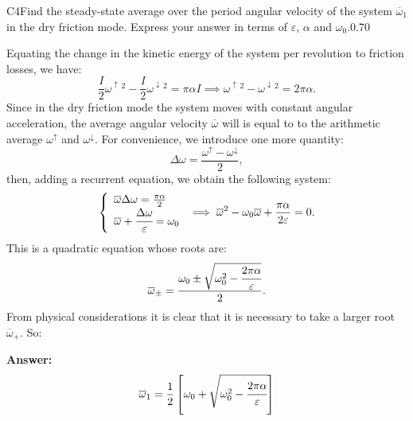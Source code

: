 \documentclass[11pt,a4paper]{article}
\begin{document}
\begin{solcard}{C4}{Find the steady-state average over the period angular velocity of the system $\overline\omega_1$ in the dry friction mode. Express your answer in terms of $\varepsilon$, $\alpha$ and $\omega_0$.}{0.70}

Equating the change in the kinetic energy of the system per revolution to friction losses, we have: \[\frac I2\omega^{\uparrow\,2}-\frac I2\omega^{\downarrow\,2}=\pi\alpha I\implies\omega^{\uparrow\,2}-\omega^{\downarrow\,2}=2\pi\alpha.\] Since in the dry friction mode the system moves with constant angular acceleration, the average angular velocity $\overline\omega$ will is equal to to the arithmetic average $\omega^\uparrow$ and $\omega^\downarrow$. For convenience, we introduce one more quantity:\[\Delta\omega=\frac{\omega^\uparrow-\omega^\downarrow}2,\]then, adding a recurrent equation, we obtain the following system:\[\left\{\begin{array}l\overline\omega\Delta\omega=\frac{\pi\alpha}2\\\overline\omega+\cfrac{\Delta\omega}\varepsilon=\omega_0\end{array}\right.\implies\overline\omega^2-\omega_0\overline\omega+\frac{\pi\alpha}{2\varepsilon}=0.\]This is a quadratic equation whose roots are:\[\overline\omega_\pm=\frac{\omega_0\pm\sqrt{\omega_0^2-\cfrac{2\pi\alpha}\varepsilon}}{2}.\]From physical considerations it is clear that it is necessary to take a larger root $\overline\omega_+$. So:

\par\smallskip\noindent\textbf{Answer:} \[\overline\omega_1=\frac12\left[\omega_0+\sqrt{\omega_0^2-\cfrac{2\pi\alpha}\varepsilon}\right]\]
\end{solcard}
\end{document}
